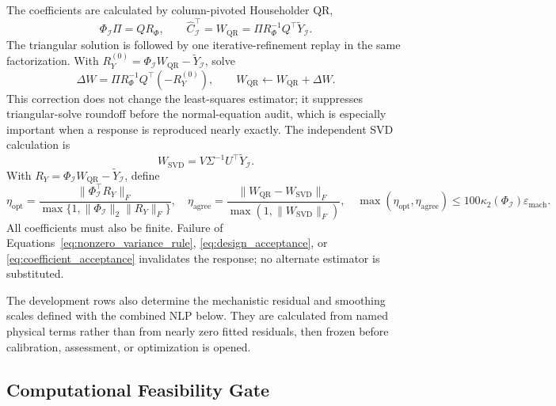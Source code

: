 \documentclass[a4paper,fleqn]{cas-sc}
\begin{document}
The coefficients are calculated by column-pivoted Householder QR,
\begin{equation}
\Phi_{\mathcal I}\Pi=QR_\Phi,
\qquad
\widehat C_{\mathcal I}^{\top}=W_{\mathrm{QR}}
=\Pi R_\Phi^{-1}Q^\top\widetilde Y_{\mathcal I}.
\end{equation}
The triangular solution is followed by one iterative-refinement replay in the same factorization. With $R_Y^{(0)}=\Phi_{\mathcal I}W_{\mathrm{QR}}-\widetilde Y_{\mathcal I}$, solve
\begin{equation}
\Delta W=\Pi R_\Phi^{-1}Q^\top(-R_Y^{(0)}),
\qquad W_{\mathrm{QR}}\leftarrow W_{\mathrm{QR}}+\Delta W.
\end{equation}
This correction does not change the least-squares estimator; it suppresses triangular-solve roundoff before the normal-equation audit, which is especially important when a response is reproduced nearly exactly.
The independent SVD calculation is
\begin{equation}
W_{\mathrm{SVD}}=V\Sigma^{-1}U^\top\widetilde Y_{\mathcal I}.
\end{equation}
With $R_Y=\Phi_{\mathcal I}W_{\mathrm{QR}}-\widetilde Y_{\mathcal I}$, define
\begin{equation}
\label{eq:coefficient_acceptance}
\eta_{\mathrm{opt}}=
\frac{\|\Phi_{\mathcal I}^\top R_Y\|_F}
{\max\{1,\|\Phi_{\mathcal I}\|_2\|R_Y\|_F\}},
\quad
\eta_{\mathrm{agree}}=
\frac{\|W_{\mathrm{QR}}-W_{\mathrm{SVD}}\|_F}
{\max(1,\|W_{\mathrm{SVD}}\|_F)},
\quad
\max(\eta_{\mathrm{opt}},\eta_{\mathrm{agree}})
\leq100\kappa_2(\Phi_{\mathcal I})\varepsilon_{\mathrm{mach}}.
\end{equation}
All coefficients must also be finite. Failure of Equations~\eqref{eq:nonzero_variance_rule}, \eqref{eq:design_acceptance}, or \eqref{eq:coefficient_acceptance} invalidates the response; no alternate estimator is substituted.

The development rows also determine the mechanistic residual and smoothing scales defined with the combined NLP below. They are calculated from named physical terms rather than from nearly zero fitted residuals, then frozen before calibration, assessment, or optimization is opened.

\subsection{Computational Feasibility Gate}
\end{document}
